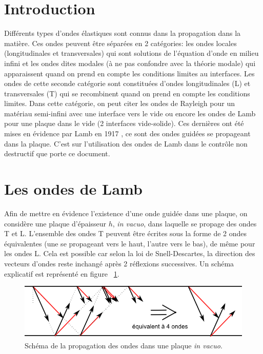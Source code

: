 \documentclass[twoside]{article}
\begin{document}
\begin{multicols}{2} %

\section{Introduction}
Différents types d'ondes élastiques sont connus dans la propagation dans la matière. Ces ondes peuvent être séparées en 2 catégories: les ondes locales (longitudinales et transversales) qui sont solutions de l'équation d'onde en milieu infini et les ondes dites modales (à ne pas confondre avec la théorie modale) qui apparaissent quand on prend en compte les conditions limites au interfaces. Les ondes de cette seconde catégorie sont constituées d'ondes longitudinales (L) et transversales (T) qui se recombinent quand on prend en compte les conditions limites.  Dans cette  catégorie, on peut citer les ondes de Rayleigh pour un matériau semi-infini avec une interface vers le vide ou encore les ondes de Lamb pour une plaque dans le vide (2 interfaces vide-solide). Ces dernières ont été mises en évidence par Lamb en 1917 \cite{Lamb}, ce sont des ondes guidées se propageant dans la plaque.
C'est sur l'utilisation des ondes de Lamb dans le contrôle non destructif que porte ce document.

\section{Les ondes de Lamb}
Afin de mettre en évidence l’existence d'une onde guidée dans une plaque, on considère une plaque d'épaisseur $h$, \emph{in vacuo}, dans laquelle se propage des ondes T et L. L'ensemble des ondes T peuvent être écrites sous la forme de 2 ondes équivalentes (une se propageant vers le haut, l'autre vers le bas), de même pour les ondes L. Cela est possible car selon la loi de Snell-Descartes, la direction des vecteurs d'ondes reste inchangé après 2 réflexions successives. Un schéma explicatif est représenté en figure ~\ref{fig1}.


\begin{figure}[H]
\centering
\includegraphics[scale=0.5]{./images/lamb_expli.png}
\caption{\label{fig1} Schéma de la propagation des ondes dans une plaque \emph{in vacuo}.}
\end{figure}


\end{multicols}
\end{document}
